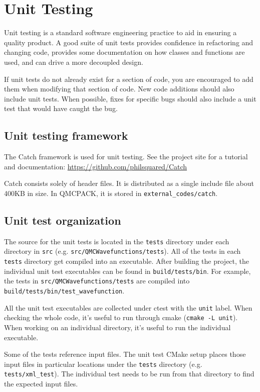 \chapter{Unit Testing}
\label{chap:unit_testing}

Unit testing is a standard software engineering practice to aid in ensuring a quality product. A good suite of unit tests provides confidence in refactoring and changing code, provides some documentation on how classes and functions are used, and can drive a more decoupled design.

If unit tests do not already exist for a section of code, you are encouraged to add them when modifying that section of code.  New code additions should also include unit tests.
When possible, fixes for specific bugs should also include a unit test that would have caught the bug.

\section {Unit testing framework} The Catch framework is used for unit testing.
See the project site for a tutorial and documentation: \url{https://github.com/philsquared/Catch}

Catch consists solely of header files. It is distributed as a single include file about 400KB in size.  In QMCPACK, it is stored in \texttt{external\_codes/catch}.

\section{Unit test organization}

The source for the unit tests is located in the \texttt{tests} directory under each directory in \texttt{src} (e.g. \texttt{src/QMCWavefunctions/tests}).
All of the tests in each \texttt{tests} directory get compiled into an executable.
After building the project, the individual unit test executables can be found in \texttt{build/tests/bin}.
For example, the tests in \texttt{src/QMCWavefunctions/tests} are compiled into \texttt{build/tests/bin/test\_wavefunction}.

All the unit test executables are collected under ctest with the \texttt{unit} label.
When checking the whole code, it's useful to run through cmake (\texttt{cmake -L unit}).
When working on an individual directory, it's useful to run the individual executable.

Some of the tests reference input files. The unit test CMake setup places those input files in particular locations under the \texttt{tests} directory (e.g. \texttt{tests/xml\_test}).  The individual test needs to be run from that directory to find the expected input files.


